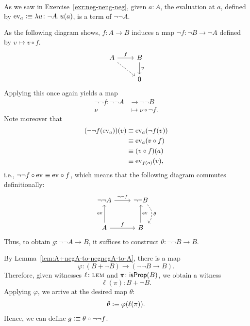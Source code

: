 \begin{solution}
    As we saw in Exercise~\ref{exr:neg-neng-neg}, given $a\colon A$, the evaluation at $a$, defined by $\ev a\defeq\lambda u\colon\neg A.\,u(a)$, is a term of $\neg\neg A$.

    As the following diagram shows, $f\colon A\to B$ induces a map $\neg f\colon\neg B\to\neg A$ defined by $v\mapsto v\circ f$.
    \[
        \begin{tikzcd}
            A
                \arrow[r,"f"]
                \arrow[rd,dashed]
            &B
                \arrow[d,"v"]\\
            &\fun0
        \end{tikzcd}
    \]
    Applying this once again yields a map
    \begin{align*}
       \neg\neg f\colon\neg\neg A&\to\neg\neg B\\
       \nu&\mapsto\nu\circ\neg f.
    \end{align*}
    Note moreover that
    \begin{align*}
       (\neg\neg f({\operatorname{ev}}_{a}))(v)
            &\equiv{\operatorname{ev}}_{a}(\neg f(v))\\
            &\equiv{\operatorname{ev}}_{a}(v\circ f)\\
            &\equiv (v\circ f)(a)\\
            &\equiv {\operatorname{ev}}_{f(a)}(v),
    \end{align*}
    i.e., $\neg\neg f\circ{\operatorname{ev}}_{}\equiv{\operatorname{ev}}_{}\circ f$, which means that the following diagram commutes definitionally:
    \[
        \begin{tikzcd}[row sep=large]
            \neg\neg A
                \arrow[r,"\neg\neg f"]
            &\neg\neg B
                \arrow[d,dashed,bend left=49,"\theta",shift left]\\
            A
                \arrow[r,"f"]
                \arrow[u,"\ev{}"]
            &B
                \arrow[u,"\ev{}"']
        \end{tikzcd}
    \]
    Thus, to obtain $g\colon\neg\neg A\to B$, it suffices to construct $\theta\colon\neg\neg B\to B$.
    
    By Lemma~\ref{lem:A+negA-to-negnegA-to-A}, there is a map
    \[
        \varphi\colon(B+\neg B)\to(\neg\neg B\to B).
    \]
    Therefore, given witnesses $\ell\colon\Lem$ and $\pi\colon\fun{isProp}(B)$, we obtain a witness
    \[
        \ell(\pi)\colon B+\neg B.
    \]
    Applying $\varphi$, we arrive at the desired map $\theta$:
    \[
        \theta\mathrel{\vcentcolon}\equiv\varphi(\ell(\pi)).
    \]
    Hence, we can define $g\mathrel{\vcentcolon}\equiv\theta\circ\neg\neg f$.
    

\end{solution}
